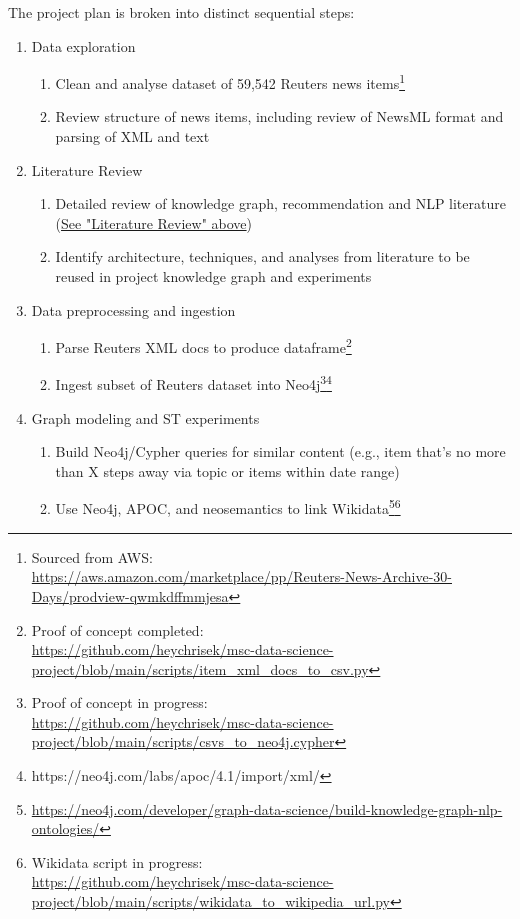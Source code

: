 \documentclass[11pt]{article}
\begin{document}
The project plan is broken into distinct sequential steps:
\begin{enumerate}
\item{Data exploration} \label{sec:PropDataExploration}
  \begin{enumerate}
  \item Clean and analyse dataset of 59,542 Reuters news items\footnote{Sourced from AWS:\\ \url{https://aws.amazon.com/marketplace/pp/Reuters-News-Archive-30-Days/prodview-qwmkdffmmjesa}}
  \item Review structure of news items, including review of NewsML format and parsing of XML and text
  \end{enumerate}
\item{Literature Review} \label{sec:PropLiteratureReview}
  \begin{enumerate}
  \item Detailed review of knowledge graph, recommendation and NLP literature (\hyperref[sec:LiteratureReview]{See "Literature Review" above})
  \item Identify architecture, techniques, and analyses from literature to be reused in project knowledge graph and experiments
  \end{enumerate}
\item{Data preprocessing and ingestion} \label{sec:PropDataProcessing}
  \begin{enumerate}
  \item Parse Reuters XML docs to produce dataframe\footnote{Proof of concept completed:\\ \url{https://github.com/heychrisek/msc-data-science-project/blob/main/scripts/item_xml_docs_to_csv.py}}
  \item Ingest subset of Reuters dataset into Neo4j\footnote{Proof of concept in progress:\\ \url{https://github.com/heychrisek/msc-data-science-project/blob/main/scripts/csvs_to_neo4j.cypher}}\footnote{https://neo4j.com/labs/apoc/4.1/import/xml/}
  \end{enumerate}
\item{Graph modeling and ST experiments} \label{sec:PropGraphModeling}
  \begin{enumerate}
  \item Build Neo4j/Cypher queries for similar content (e.g., item that’s no more than X steps away via topic or items within date range)
  \item Use Neo4j, APOC, and neosemantics to link Wikidata\footnote{\url{https://neo4j.com/developer/graph-data-science/build-knowledge-graph-nlp-ontologies/}}\footnote{Wikidata script in progress:\\ \url{https://github.com/heychrisek/msc-data-science-project/blob/main/scripts/wikidata_to_wikipedia_url.py}}

\end{enumerate}
\end{enumerate}
\end{document}
